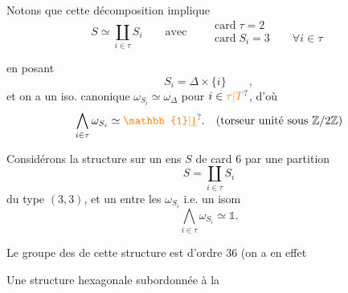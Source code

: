 Notons que cette décomposition implique
\[
S\simeq\coprod_{i\in\tau}S_i\qquad\text{avec}\quad
\begin{aligned}
&\operatorname{card}\tau=2\\
&\operatorname{card}S_i=3\qquad\forall i\in\tau
\end{aligned}
\]

en posant
\[
S_i=\Delta\times\{i\}\qquad,
\]
et on a un iso. canonique $\omega_{S_i}\simeq\omega_\Delta$ pour  $i\in\unsure{\tau|T}$, d'où
\[
\bigwedge_{i\in\tau}\omega_{S_i}\simeq\unsure{\mathbb{1}|\underline{1}}.
\quad\text{(torseur unité sous $\mathbb Z/2\mathbb Z$)}
\]

Considérons la structure  sur un ens $S$ de card $6$  par une partition
\[
S=\coprod_{i\in\tau}S_i
\]
du type $(3,3)$, et un  entre les $\omega_{S_i}$ i.e. un isom
\[
\bigwedge_{i\in\tau}\omega_{S_i}\simeq\mathbb{1}.\tag*{$(*)$}
\]

 Le groupe des  de cette structure est d'ordre $36$ (on a en effet


Une structure hexagonale subordonnée à la

